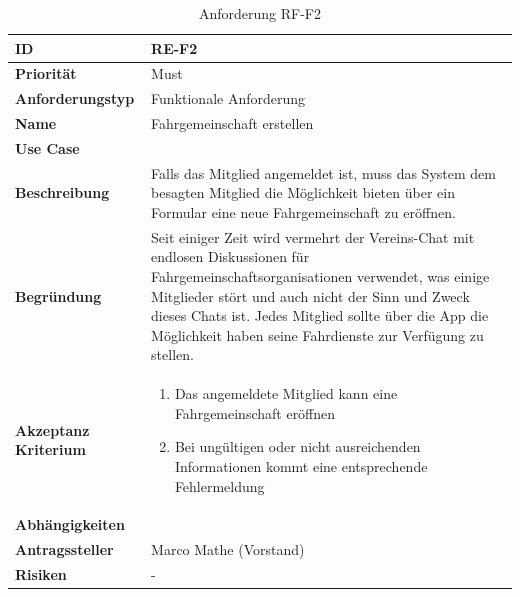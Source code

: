 \begin{table}[ht]
\centering
  \begin{tabular}{ l | p{8cm} }
	\hline
	\rowcolor{gray}
	\textbf{ID} 			&	\textbf{RE-F2}\\ \hline
	\textbf{Priorität} 		&	Must\\ \hline
	\textbf{Anforderungstyp}	&	Funktionale Anforderung\\ \hline
	\textbf{Name} 			&	Fahrgemeinschaft erstellen\\ \hline
	\textbf{Use Case} 		&	\nameref{table:use_case_1}\\ \hline
	\textbf{Beschreibung} 	&	Falls das Mitglied angemeldet ist, muss das System dem besagten Mitglied die Möglichkeit bieten über ein Formular eine neue Fahrgemeinschaft zu eröffnen.\\ \hline
	\textbf{Begründung} 		&	Seit einiger Zeit wird vermehrt der Vereins-Chat mit endlosen Diskussionen für Fahrgemeinschaftsorganisationen verwendet, was einige Mitglieder stört und auch nicht der Sinn und Zweck dieses Chats ist. Jedes Mitglied sollte über die App die Möglichkeit haben seine Fahrdienste zur Verfügung zu stellen.\\ \hline
	\textbf{Akzeptanz Kriterium}	&	\begin{enumerate}
					\item Das angemeldete Mitglied kann eine Fahrgemeinschaft eröffnen
					\item Bei ungültigen oder nicht ausreichenden Informationen kommt eine entsprechende Fehlermeldung
					\end{enumerate}
					\\ \hline
	\textbf{Abhängigkeiten} 	&	\nameref{table:req_1}\\ \hline
	\textbf{Antragssteller} 	&	Marco Mathe (Vorstand)\\ \hline
	\textbf{Risiken}	 	&	-
  \end{tabular}
   \caption{Anforderung RF-F2}\label{table:req_2}
\end{table}


